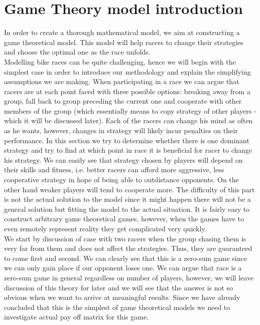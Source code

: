 \documentclass[10pt, a4paper]{report}
\begin{document}

\section{Game Theory model introduction}

In order to create a thorough mathematical model, we aim at constructing a game theoretical model. This model will help racers to change their strategies and choose the optimal one as the race unfolds.\\ 

Modelling bike races can be quite challenging, hence we will begin with the simplest case in order to introduce our methodology and explain the simplifying assumptions we are making. When participating in a race we can argue that racers are at each point faced with three possible options: breaking away from a group, fall back to group preceding the current one and cooperate with other members of the group (which essentially means to copy strategy of other players - which it will be discussed later). Each of the racers can change his mind as often as he wants, however, changes in strategy will likely incur penalties on their performance. In this section we try to determine whether there is one dominant strategy and try to find at which point in race it is beneficial for racer to change his strategy. We can easily see that strategy chosen by players will depend on their skills and fitness, i.e. better racers can afford more aggressive, less cooperative strategy in hope of being able to outdistance opponents. On the other hand weaker players will tend to cooperate more. The difficulty of this part is not the actual solution to the model since it might happen there will not be a general solution but fitting the model to the actual situation. It is fairly easy to construct arbitrary game theoretical games, however, when the games have to even remotely represent reality they get complicated very quickly.\\

We start by discussion of case with two racers when the group chasing them is very far from them and does not affect the strategies. Thus, they are guaranteed to come first and second. We can clearly see that this is a zero-sum game since we can only gain place if our opponent loses one. We can argue that race is a zero-sum game in general regardless on number of players, however, we will leave discussion of this theory for later and we will see that the answer is not so obvious when we want to arrive at meaningful results. Since we have already concluded that this is the simplest of game theoretical models we need to investigate actual pay off matrix for this game. \\
\end{document}

